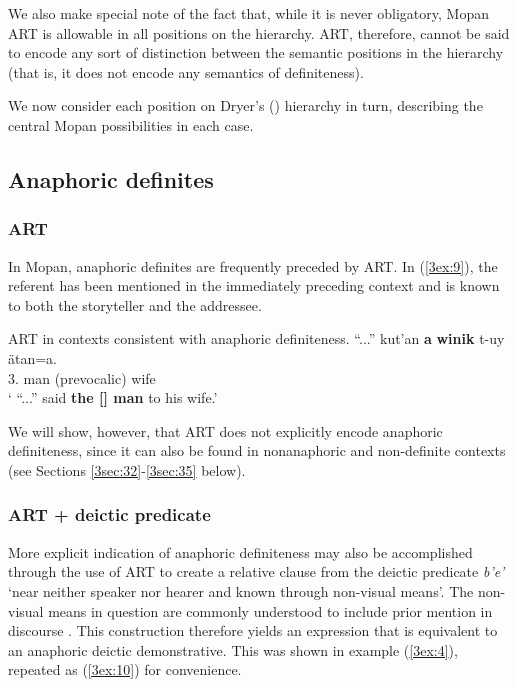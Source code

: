 \documentclass[output=paper]{langsci/langscibook}
\begin{document}
We also make special note of the fact that, while it is never obligatory, Mopan ART is allowable in all positions on the hierarchy.  ART, therefore, cannot be said to encode any sort of distinction between the semantic positions in the hierarchy (that is, it does not encode any semantics of definiteness).  

We now consider each position on Dryer's (\citeyear{dryer:14}) hierarchy in turn, describing the central Mopan possibilities in each case.


\subsection{Anaphoric definites}\label{3sec:31}

\subsubsection{ART}\label{3sec:311}
In Mopan, anaphoric definites are frequently preceded by ART. In (\ref{3ex:9}), the referent has been mentioned in the immediately preceding context and is known to both the storyteller and the addressee.

\begin{exe}
\ex\label{3ex:9}
ART in contexts consistent with anaphoric definiteness. 
\exi{}
\gll	``...'' 	kut'an		{\bf{a}}	{\bf{winik}}		t-uy					\"atan=a. \\
	{}	3.{}	{}	man			{}(prevocalic)	wife{} \\
\glt	` ``...'' said {\bf{the [{}] man}} to his wife.'
\end{exe}

We will show, however, that ART does not explicitly encode anaphoric definiteness, since it can also be found in nonanaphoric and non-definite contexts (see Sections \ref{3sec:32}-\ref{3sec:35} below). 

\subsubsection{ART + deictic predicate}\label{3sec:312}

More explicit indication of anaphoric definiteness may also be accomplished through the use of ART to create a relative clause from the deictic predicate {\emph{b'e'}} `near neither speaker nor hearer and known through non-visual means'. The non-visual means in question are commonly understood to include prior mention in discourse \citep{danziger:94}. This construction therefore yields an expression that is equivalent to an anaphoric deictic demonstrative. This was shown in example (\ref{3ex:4}), repeated as (\ref{3ex:10}) for convenience.
\end{document}
